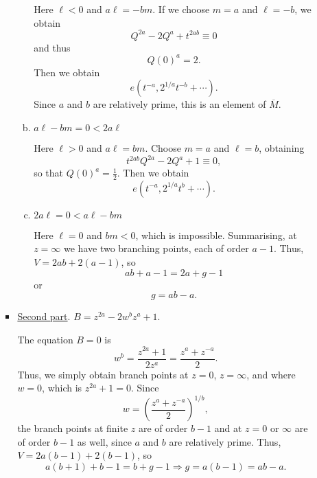 \documentclass[a4paper,11pt]{article}
\begin{document}
\begin{enumerate}
\begin{itemize}
\begin{itemize}
\begin{enumerate}[(a)]
        Here $\ell < 0$ and $a \ell = -bm$.  If we choose $m = a$ and
        $\ell = -b$, we obtain
        $$
        Q^{2a} - 2Q^a + t^{2ab} \equiv 0
        $$
        and thus
        $$
        Q(0)^a = 2.
        $$
        Then we obtain
        $$
        e(t^{-a}, 2^{1/a} t^{-b} + \cdots).
        $$
        Since $a$ and $b$ are relatively prime, this is an element of
        $\overline{M}$.

      \item \underline{$a\ell - bm = 0 < 2a\ell$}

        Here $\ell > 0$ and $a \ell = bm$.  Choose $m=a$ and $\ell =
        b$, obtaining 
        $$
        t^{2ab} Q^{2a} - 2Q^a + 1 \equiv 0,
        $$
        so that $Q(0)^a = \frac{1}{2}$.  Then we obtain
        $$
        e(t^{-a}, 2^{1/a} t^b + \cdots).
        $$

      \item \underline{$2a\ell = 0 < a\ell - bm$}

        Here $\ell = 0$ and $bm < 0$, which is impossible.
        Summarising, at $z = \infty$ we have two branching points,
        each of order $a-1$.  Thus, $V = 2ab + 2(a-1)$, 
        so
        $$
        ab + a - 1 = 2a + g - 1
        $$
        or
        $$
        g = ab - a.
        $$
      \end{enumerate}

    \item \underline{Second part}. $B = z^{2a} - 2w^b z^a + 1$.

      The equation $B = 0$ is
      $$
      w^b = \frac{z^{2a} + 1}{2z^a} = \frac{z^a + z^{-a}}{2}.
      $$
      Thus, we simply obtain branch points at $z = 0$, $z = \infty$,
      and where $w = 0$, which is $z^{2a} + 1 = 0$.  Since
      $$
      w = \left(\frac{z^a + z^{-a}}{2}\right)^{1/b},
      $$
      the branch points at finite $z$ are of order $b-1$ and at $z =
      0$ or $\infty$ are of order $b-1$ as well, since $a$ and $b$
      are relatively prime.  Thus, $V = 2a(b-1) + 2(b-1)$, so
      $$
      a(b+1) + b - 1 = b + g - 1
      \Rightarrow g = a(b-1) = ab-a.
      $$


\end{itemize}
\end{itemize}
\end{enumerate}
\end{document}
